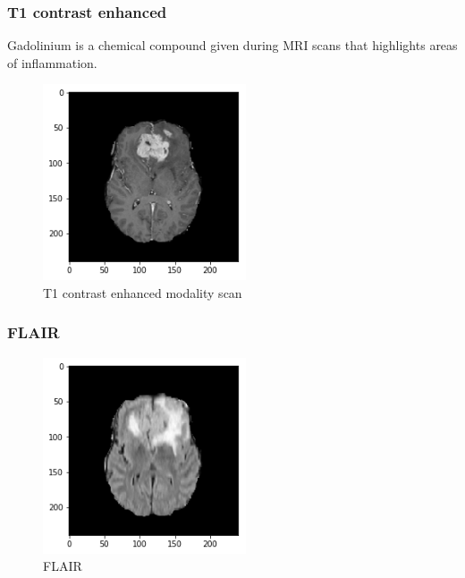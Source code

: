 \subsubsection{T1 contrast enhanced}
Gadolinium is a chemical compound given during MRI scans that highlights areas of inflammation.
\begin{figure}[H]
\centering
\includegraphics[width=6cm]{chapters/06_hdm/c_Brats18_2013_17_1_L1/46.png}
\caption{T1 contrast enhanced modality scan}
\end{figure}

\subsubsection{FLAIR}
\begin{figure}[H]
\centering
\includegraphics[width=6cm]{chapters/06_hdm/c_Brats18_2013_17_1_L1/56.png}
\caption{FLAIR}
\end{figure}
